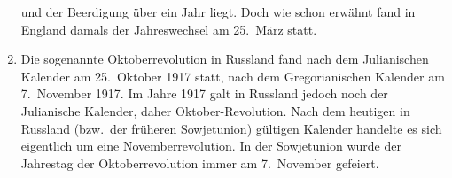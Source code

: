 \begin{enumerate}
und der Beerdigung \"uber ein Jahr liegt. Doch wie schon erw\"ahnt fand in England damals der 
Jahreswechsel am 25.\ M\"arz statt. 
\item
Die sogenannte Oktoberrevolution 
in Russland fand nach dem Julianischen Kalender am 25.\ Oktober
1917 statt, nach dem Gregorianischen Kalender am 7.\ November 1917. Im Jahre 1917 galt in Russland
jedoch noch der Julianische Kalender, daher \glqq Oktober-\grqq Revolution. Nach dem heutigen in Russland 
(bzw.\ der fr\"uheren Sowjetunion) g\"ultigen Kalender
handelte es sich eigentlich um eine Novemberrevolution. In der Sowjetunion wurde der
Jahrestag der Oktoberrevolution immer am 7.\ November gefeiert. 
\end{enumerate}  

%

